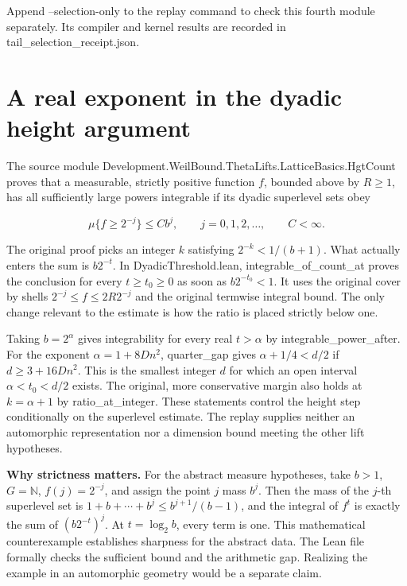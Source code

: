\documentclass[11pt,letterpaper]{article}
\begin{document}
Append --selection-only to the replay command to check this fourth module separately. Its compiler and kernel results are recorded in tail\_selection\_receipt.json.

\clearpage\section{A real exponent in the dyadic height argument}
The source module {\ttfamily\small Development.\allowbreak{}WeilBound.\allowbreak{}ThetaLifts.\allowbreak{}LatticeBasics.\allowbreak{}HgtCount} proves that a measurable, strictly positive function \(f\), bounded above by \(R\ge1\), has all sufficiently large powers integrable if its dyadic superlevel sets obey

\[\mu\{f\ge 2^{-j}\}\le Cb^j,\qquad j=0,1,2,\ldots,
\qquad C<\infty.\]

The original proof picks an integer \(k\) satisfying \(2^{-k}<1/(b+1)\). What actually enters the sum is \(b2^{-t}\). In {\ttfamily\small DyadicThreshold.\allowbreak{}lean}, {\ttfamily\small integrable\_\allowbreak{}of\_\allowbreak{}count\_\allowbreak{}at} proves the conclusion for every \(t\ge t_0\ge0\) as soon as \(b2^{-t_0}<1\). It uses the original cover by shells \(2^{-j}\le f\le2R2^{-j}\) and the original termwise integral bound. The only change relevant to the estimate is how the ratio is placed strictly below one.

Taking \(b=2^\alpha\) gives integrability for every real \(t>\alpha\) by {\ttfamily\small integrable\_\allowbreak{}power\_\allowbreak{}after}. For the exponent \(\alpha=1+8Dn^2\), {\ttfamily\small quarter\_\allowbreak{}gap} gives \(\alpha+1/4<d/2\) if \(d\ge3+16Dn^2\). This is the smallest integer \(d\) for which an open interval \(\alpha<t_0<d/2\) exists. The original, more conservative margin also holds at \(k=\alpha+1\) by {\ttfamily\small ratio\_\allowbreak{}at\_\allowbreak{}integer}. These statements control the height step conditionally on the superlevel estimate. The replay supplies neither an automorphic representation nor a dimension bound meeting the other lift hypotheses.

\textbf{Why strictness matters.} For the abstract measure hypotheses, take \(b>1\), \(G=\mathbb N\), \(f(j)=2^{-j}\), and assign the point \(j\) mass \(b^j\). Then the mass of the \(j\)-th superlevel set is \(1+b+\cdots+b^j\le b^{j+1}/(b-1)\), and the integral of \(f^t\) is exactly the sum of \((b2^{-t})^j\). At \(t=\log_2 b\), every term is one. This mathematical counterexample establishes sharpness for the abstract data. The Lean file formally checks the sufficient bound and the arithmetic gap. Realizing the example in an automorphic geometry would be a separate claim.
\end{document}
